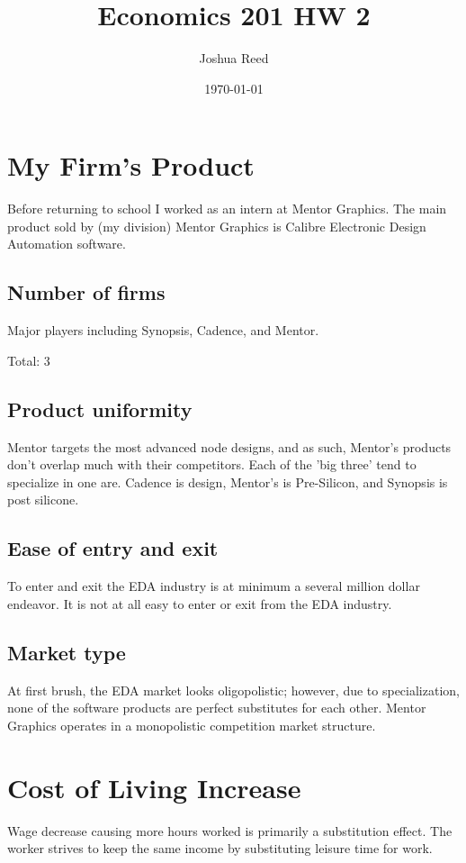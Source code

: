 \documentclass[a4paper]{article}
\title{Economics 201 HW 2}
\author{Joshua Reed}
\date{\today}
\begin{document}
\maketitle

\section{My Firm's Product}

Before returning to school I worked as an intern at Mentor Graphics. The main product
sold by (my division) Mentor Graphics is Calibre Electronic Design Automation software.

\subsection{Number of firms} 
Major players including Synopsis, Cadence, and Mentor.

Total: 3

\subsection{Product uniformity} 
Mentor targets the most advanced node designs, and as such,
Mentor's products don't overlap much with their competitors. Each of the 'big three' tend 
to specialize in one are. Cadence is design, Mentor's is Pre-Silicon, and Synopsis is post
silicone.

\subsection{Ease of entry and exit} 
To enter and exit the EDA industry is at minimum a several 
million dollar endeavor. It is not at all easy to enter or exit from the EDA industry.

\subsection{Market type} 
At first brush, the EDA market looks oligopolistic; however, due to 
specialization, none of the software products are perfect substitutes for each other. 
Mentor Graphics operates in a monopolistic competition market structure.





\section{Cost of Living Increase}
Wage decrease causing more hours worked is primarily a substitution effect. The worker strives
to keep the same income by substituting leisure time for work.
\end{document}
